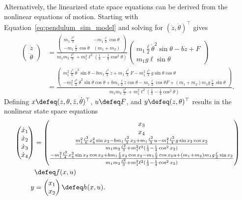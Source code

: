 Alternatively, the linearized state space equations can be derived from the nonlinear equations of motion.  Starting with Equation~\eqref{eq:pendulum_sim_model} and solving for $(\ddot{z}, \ddot{\theta})^\top$ gives
{\small
\begin{align*}
\begin{pmatrix} \ddot{z} \\ \ddot{\theta} \end{pmatrix}
  &= \frac{\begin{pmatrix} m_1\frac{\ell^2}{3} & -m_1\frac{\ell}{2}\cos\theta \\ -m_1\frac{\ell}{2}\cos\theta & (m_1+m_2)\end{pmatrix}}{m_1m_2\frac{\ell^2}{3} + m_1^2 \ell^2(\frac{1}{3} -\frac{1}{4}\cos^2\theta)}\begin{pmatrix} m_1\frac{\ell}{2}\dot{\theta}^2\sin\theta-b\dot{z}+F \\ m_1g\ell\sin\theta \end{pmatrix} \\
  &= \frac{\begin{pmatrix} m_1^2\frac{\ell^3}{6}\dot{\theta}^2\sin\theta - bm_1\frac{\ell^2}{3}\dot{z} + m_1\frac{\ell^2}{3}F - m_1^2\frac{\ell^2}{4}g\sin\theta\cos\theta \\ 
  -m_1^2\frac{\ell^2}{4}\dot{\theta}^2\sin\theta\cos\theta + bm_1\frac{\ell}{2}\dot{z}\cos\theta - m_1\frac{\ell}{2}\cos\theta F + (m_1+m_2)m_1g\frac{\ell}{2}\sin\theta\end{pmatrix}}{m_1m_2\frac{\ell^2}{3} + m_1^2 \ell^2(\frac{1}{3} -\frac{1}{4}\cos^2\theta)}.
\end{align*}
}
Defining $x\defeq (z, \theta, \dot{z}, \dot{\theta})^\top$, $u\defeq F$, and $y\defeq (z, \theta)^\top$ results in the nonlinear state space equations
{\normalsize
\begin{align*}
\begin{pmatrix}\dot{x}_1 \\ \dot{x}_2 \\ \dot{x}_3 \\ \dot{x}_4 \end{pmatrix} &= \begin{pmatrix} x_3 \\ x_4 \\ 
\frac{ m_1^2\frac{\ell^3}{6}x_4^2\sin x_2 - bm_1\frac{\ell^2}{3}x_3 + m_1\frac{\ell^2}{3}u - m_1^2\frac{\ell^2}{4}g\sin x_2 \cos x_2}{m_1m_2\frac{\ell^2}{3} + m_1^2 \ell^2(\frac{1}{3} -\frac{1}{4}\cos^2 x_2)} \\
\frac{-m_1^2\frac{\ell^2}{4}x_4^2\sin x_2 \cos x_2 + bm_1\frac{\ell}{2} x_3 \cos x_2 - m_1\frac{\ell}{2}\cos x_2 u + (m_1+m_2)m_1g\frac{\ell}{2}\sin x_2}{m_1m_2\frac{\ell^2}{3} + m_1^2 \ell^2(\frac{1}{3} -\frac{1}{4}\cos^2x_2)}
\end{pmatrix} \\ 
&\defeq f(x,u) \\
y &= \begin{pmatrix} x_1 \\ x_2 \end{pmatrix} \defeq h(x,u).
\end{align*}
}
